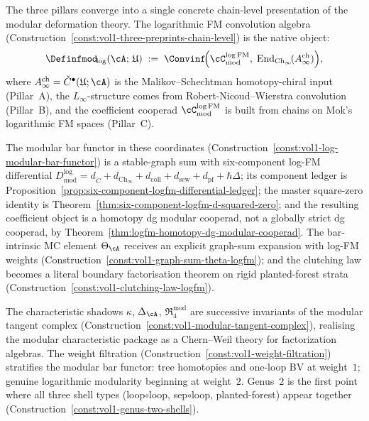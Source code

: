 \begin{summary}
\label{sum:three-pillars-chain-level}
The three pillars converge into a single concrete chain-level
presentation of the modular deformation theory. The logarithmic FM
convolution algebra
(Construction~\ref{const:vol1-three-preprints-chain-level}) is the
native object:
\[
{\Definfmod}_{\!\log}(\cA;\, \mathfrak{U})
\;:=\;
\Convinf\!\Bigl(
\cC^{\log\mathrm{FM}}_{\mathrm{mod}},\;
\operatorname{End}_{\mathrm{Ch}_\infty}\!(A^{\mathrm{ch}}_\infty)
\Bigr),
\]
where $A^{\mathrm{ch}}_\infty = \check{C}^\bullet(\mathfrak{U};\cA)$ is
the Malikov--Schechtman homotopy-chiral input (Pillar~A), the
$L_\infty$-structure comes from Robert-Nicoud--Wierstra convolution
(Pillar~B), and the coefficient cooperad
$\cC^{\log\mathrm{FM}}_{\mathrm{mod}}$ is built from chains on
Mok's logarithmic FM spaces (Pillar~C).

The modular bar functor in these coordinates
(Construction~\ref{const:vol1-log-modular-bar-functor}) is a
stable-graph sum with six-component log-FM differential
$D^{\log}_{\mathrm{mod}} = d_{\check{C}} + d_{\mathrm{Ch}_\infty}
+ d_{\mathrm{coll}} + d_{\mathrm{sew}} + d_{\mathrm{pf}}
+ \hbar\Delta$; its component ledger is
Proposition~\ref{prop:six-component-logfm-differential-ledger}; the
master square-zero identity is
Theorem~\ref{thm:six-component-logfm-d-squared-zero}; and the resulting
coefficient object is a homotopy dg modular cooperad, not a globally
strict dg cooperad, by
Theorem~\ref{thm:logfm-homotopy-dg-modular-cooperad}.
The bar-intrinsic MC element $\Theta_\cA$ receives an explicit
graph-sum expansion with log-FM weights
(Construction~\ref{const:vol1-graph-sum-theta-logfm}); and
the clutching law becomes a literal boundary factorisation theorem
on rigid planted-forest strata
(Construction~\ref{const:vol1-clutching-law-logfm}).

The characteristic shadows $\kappa$, $\Delta_\cA$,
$\mathfrak{R}^{\mathrm{mod}}_4$ are successive invariants of the
modular tangent complex
(Construction~\ref{const:vol1-modular-tangent-complex}),
realising the modular characteristic package as a Chern--Weil
theory for factorization algebras. The weight filtration
(Construction~\ref{const:vol1-weight-filtration}) stratifies the
modular bar functor: tree homotopies and one-loop BV at
weight~$1$; genuine logarithmic modularity beginning at weight~$2$.
Genus~$2$ is the first point where all three shell types
(loop$\circ$loop, sep$\circ$loop, planted-forest) appear together
(Construction~\ref{const:vol1-genus-two-shells}).


\end{summary}
